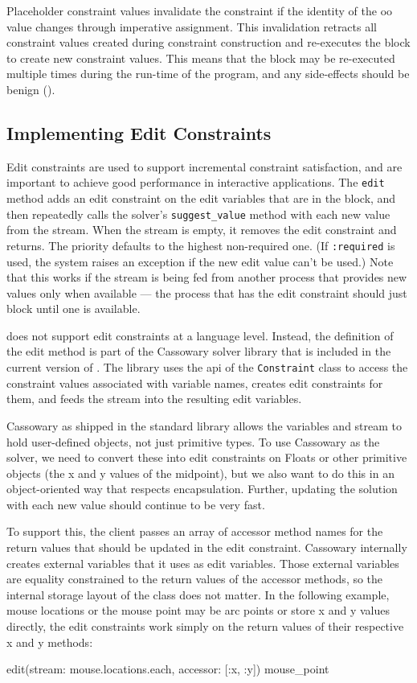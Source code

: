 Placeholder constraint values invalidate the constraint if the
identity of the \ac{oo} value changes through imperative
assignment. This invalidation retracts all constraint values created
during constraint construction and re-executes the block to create new
constraint values. This means that the block may be re-executed
multiple times during the run-time of the program, and any side-effects
should be benign ().

\subsection{Implementing Edit Constraints}
\label{sec:implementing-edit-constraints}

Edit constraints are used to support incremental constraint
satisfaction, and are important to achieve good performance in
interactive applications.  The \lstinline{edit} method adds an edit
constraint on the edit variables that are in the block, and then
repeatedly calls the solver's \lstinline{suggest_value} method with
each new value from the stream.  When the stream is empty, it removes
the edit constraint and returns.  The priority defaults to the
highest non-required one.  (If \lstinline{:required} is used,
the system raises an exception if the new edit value can't be used.)
Note that this works if the stream is being fed from another process
that provides new values only when available --- the process that has
the edit constraint should just block until one is available.

\langname does not support edit constraints at a language level.
Instead, the definition of the edit method is part of the Cassowary
solver library that is included in the current version of
\toolname. The library uses the \ac{api} of the \lstinline{Constraint}
class to access the constraint values associated with variable names,
creates edit constraints for them, and feeds the stream into the
resulting edit variables.

Cassowary as shipped in the \toolname standard library allows the
variables and stream to hold user-defined objects, not just primitive
types. To use Cassowary as the solver, we need to convert these into
edit constraints on Floats or other primitive objects (\eg the x and y
values of the midpoint), but we also want to do this in an
object-oriented way that respects encapsulation.  Further, updating
the solution with each new value should continue to be very fast.

To support this, the client passes an array of accessor method names
for the return values that should be updated in the edit
constraint. Cassowary internally creates external variables that it
uses as edit variables. Those external variables are equality
constrained to the return values of the accessor methods, so the
internal storage layout of the class does not matter. In the following
example, mouse locations or the mouse point may be arc points or store
x and y values directly, the edit constraints work simply on the
return values of their respective x and y methods:
\begin{code}
edit(stream: mouse.locations.each,
     accessor: [:x, :y]) { mouse_point }
\end{code}

